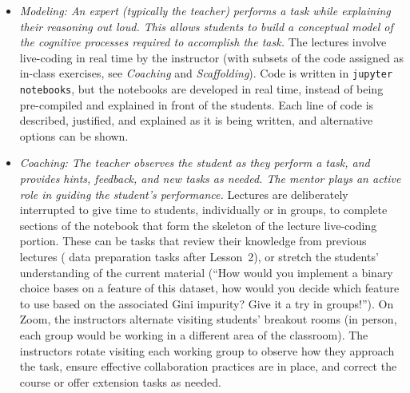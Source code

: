 \vspace{3mm}
\begin{itemize}
    \item\emph{Modeling: An expert (typically the teacher) performs a task while explaining their reasoning out loud. This allows students to build a conceptual model of the cognitive processes required to accomplish the task.} The lectures involve live-coding in real time by the instructor (with subsets of the code assigned as in-class exercises, see \emph{Coaching} and \emph{Scaffolding}). Code is written in \texttt{jupyter notebooks}, but the notebooks are developed in real time, instead of being pre-compiled and explained in front of the students. Each line of code is described, justified, and explained as it is being written, and alternative options can be shown.
    
    \item\emph{Coaching: The teacher observes the student as they perform a task, and provides hints, feedback, and new tasks as needed. The mentor plays an active role in guiding the student's performance.} Lectures are deliberately interrupted to give time to students, individually or in groups, to complete sections of the notebook that form the skeleton of the lecture live-coding portion. These can be tasks that review their knowledge from previous lectures (\eg{} data preparation tasks after Lesson~2), or stretch the students' understanding of the current material (``How would you implement a binary choice bases on a feature of this dataset, how would you decide which feature to use based on the associated Gini impurity? Give it a try in groups!''). On Zoom, the instructors alternate visiting students' breakout rooms (in person, each group would be working in a different area of the classroom). The instructors rotate visiting each working group to observe how they approach the task, ensure effective collaboration practices are in place, and correct the course or offer extension tasks as needed.


\end{itemize}
